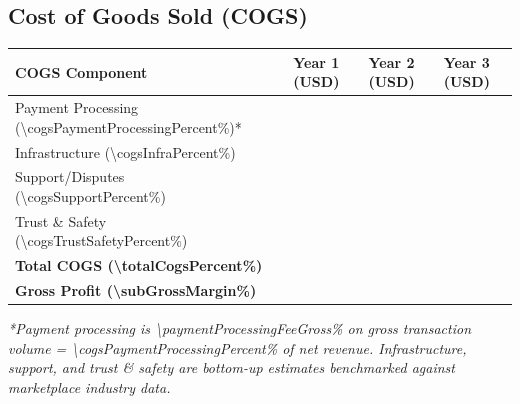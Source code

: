 \subsection{Cost of Goods Sold (COGS)}
\begin{table}[H]
\centering
\begin{tabularx}{\linewidth}{l Y Y Y}
\toprule
COGS Component & Year 1 (USD) & Year 2 (USD) & Year 3 (USD) \\\midrule
Payment Processing (\num{\cogsPaymentProcessingPercent}\%)* & \numint{\cogsPaymentYearOne} & \numint{\cogsPaymentYearTwo} & \numint{\cogsPaymentYearThree} \\
Infrastructure (\num{\cogsInfraPercent}\%) & \numint{\cogsInfraYearOne} & \numint{\cogsInfraYearTwo} & \numint{\cogsInfraYearThree} \\
Support/Disputes (\num{\cogsSupportPercent}\%) & \numint{\cogsSupportYearOne} & \numint{\cogsSupportYearTwo} & \numint{\cogsSupportYearThree} \\
Trust \& Safety (\num{\cogsTrustSafetyPercent}\%) & \numint{\cogsTrustYearOne} & \numint{\cogsTrustYearTwo} & \numint{\cogsTrustYearThree} \\\midrule
\textbf{Total COGS (\num{\totalCogsPercent}\%)} & \textbf{\numint{\totalCogsYearOne}} & \textbf{\numint{\totalCogsYearTwo}} & \textbf{\numint{\totalCogsYearThree}} \\
\textbf{Gross Profit (\num{\subGrossMargin}\%)} & \textbf{\numint{\grossProfitYearOne}} & \textbf{\numint{\grossProfitYearTwo}} & \textbf{\numint{\grossProfitYearThree}} \\
\bottomrule
\end{tabularx}
\end{table}
\textit{*Payment processing is \num{\paymentProcessingFeeGross}\% on gross transaction volume = \num{\cogsPaymentProcessingPercent}\% of net revenue. Infrastructure, support, and trust \& safety are bottom-up estimates benchmarked against marketplace industry data.}

